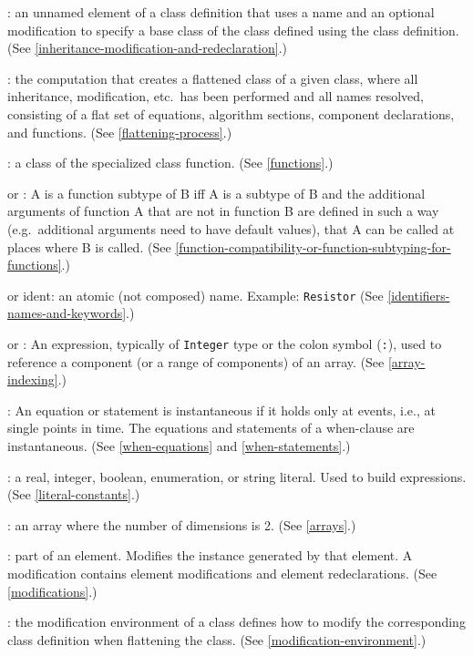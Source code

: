 : an unnamed element of a class definition that
uses a name and an optional modification to specify a base class of the
class defined using the class definition. (See \cref{inheritance-modification-and-redeclaration}.)

: the computation that creates a flattened class of a
given class, where all inheritance, modification, etc.\ has been
performed and all names resolved, consisting of a flat set of equations,
algorithm sections, component declarations, and functions. (See \cref{flattening-process}.)

: a class of the specialized class function. (See \cref{functions}.)

 or : A
is a function subtype of B iff A is a subtype of B and the additional
arguments of function A that are not in function B are defined in such a
way (e.g.\ additional arguments need to have default values), that A can
be called at places where B is called. (See \cref{function-compatibility-or-function-subtyping-for-functions}.)

 or ident: an atomic (not composed) name. Example:
\lstinline!Resistor! (See \cref{identifiers-names-and-keywords}.)

 or : An expression, typically of \lstinline!Integer! type or the colon symbol (\lstinline!:!), used to reference a component (or a range of components) of an array.  (See \cref{array-indexing}.)

: An equation or statement is instantaneous if it
holds only at events, i.e., at single points in time. The equations and
statements of a when-clause are instantaneous. (See \cref{when-equations} and
\cref{when-statements}.)

: a real, integer, boolean, enumeration, or string
literal. Used to build expressions. (See \cref{literal-constants}.)

: an array where the number of dimensions is 2. (See
\cref{arrays}.)

: part of an element. Modifies the instance
generated by that element. A modification contains element modifications
and element redeclarations. (See \cref{modifications}.)

: the modification environment of a
class defines how to modify the corresponding class definition when
flattening the class. (See \cref{modification-environment}.)

